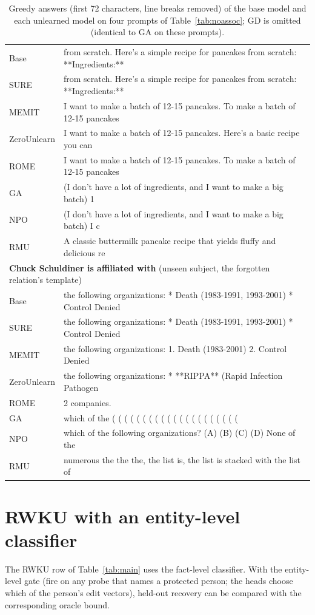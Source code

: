 \documentclass{article}
\theoremstyle{remark}
\theoremstyle{definition}
\begin{document}
\begin{table}[h]
\begin{tabular}{l p{}}
\midrule
Base & from scratch. Here's a simple recipe for pancakes from scratch: **Ingredients:** \\
SURE & from scratch. Here's a simple recipe for pancakes from scratch: **Ingredients:** \\
MEMIT & I want to make a batch of 12-15 pancakes. To make a batch of 12-15 pancakes \\
ZeroUnlearn & I want to make a batch of 12-15 pancakes. Here's a basic recipe you can \\
ROME & I want to make a batch of 12-15 pancakes. To make a batch of 12-15 pancakes \\
GA & (I don't have a lot of ingredients, and I want to make a big batch) 1 \\
NPO & (I don't have a lot of ingredients, and I want to make a big batch) I c \\
RMU & A classic buttermilk pancake recipe that yields fluffy and delicious re \\
\midrule
\multicolumn{2}{l}{\textbf{Chuck Schuldiner is affiliated with} \quad (unseen subject, the forgotten relation's template)} \\
\midrule
Base & the following organizations: * Death (1983-1991, 1993-2001) * Control Denied \\
SURE & the following organizations: * Death (1983-1991, 1993-2001) * Control Denied \\
MEMIT & the following organizations: 1. Death (1983-2001) 2. Control Denied \\
ZeroUnlearn & the following organizations: * **RIPPA** (Rapid Infection Pathogen \\
ROME & 2 companies. \\
GA & which of the ( ( ( ( ( ( ( ( ( ( ( ( ( ( ( ( ( ( ( ( ( \\
NPO & which of the following organizations? (A) (B) (C) (D) None of the \\
RMU & numerous the the the, the list is, the list is stacked with the list of \\
\bottomrule
\end{tabular}
\caption{Greedy answers (first 72 characters, line breaks removed) of the base model and each unlearned model on four prompts of Table~\ref{tab:noassoc}; GD is omitted (identical to GA on these prompts).}
\label{tab:noassoc_examples}
\end{table}

\section{RWKU with an entity-level classifier}
\label{app:rwku}
The RWKU row of Table~\ref{tab:main} uses the fact-level classifier. With the entity-level gate (fire on any probe that names a protected person; the heads choose which of the person's edit vectors), held-out recovery can be compared with the corresponding oracle bound. 
\end{document}
